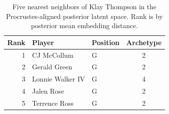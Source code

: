 \begin{table}[htbp]
  \centering\small
  \begin{tabular}{rllc}
    \toprule
    Rank & Player & Position & Archetype \\
    \midrule
    1 & CJ McCollum & G & 2 \\
    2 & Gerald Green & G & 2 \\
    3 & Lonnie Walker IV & G & 4 \\
    4 & Jalen Rose & G & 2 \\
    5 & Terrence Ross & G & 2 \\
    \bottomrule
  \end{tabular}
  \caption{Five nearest neighbors of Klay Thompson in the Procrustes-aligned posterior latent space. Rank is by posterior mean embedding distance.}
  \label{tab:Klay_Thompson_neighbors}
\end{table}

